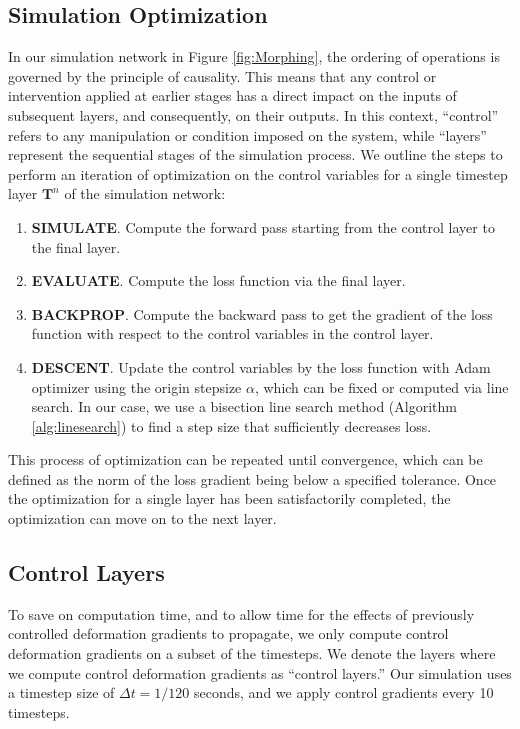 \subsection{Simulation Optimization}
    In our simulation network in Figure \ref{fig:Morphing}, the ordering of operations is governed by the principle of causality. This means that any control or intervention applied at earlier stages has a direct impact on the inputs of subsequent layers, and consequently, on their outputs. In this context, ``control'' refers to any manipulation or condition imposed on the system, while ``layers'' represent the sequential stages of the simulation process.
    We outline the steps to perform an iteration of optimization on the control variables for a single timestep layer $\textbf{T}^n$ of the simulation network:
\begin{enumerate}
    \item \textbf{SIMULATE}. Compute the forward pass starting from the control layer to the final layer.
    \item \textbf{EVALUATE}. Compute the loss function via the final layer.
    \item \textbf{BACKPROP}. Compute the backward pass to get the gradient of the loss function with respect to the control variables in the control layer.
    \item \textbf{DESCENT}. Update the control variables by the loss function with Adam optimizer using the origin stepsize $\alpha$, which can be fixed or computed via line search. In our case, we use a bisection line search method (Algorithm \ref{alg:linesearch}) to find a step size that sufficiently decreases loss.
\end{enumerate}
    This process of optimization can be repeated until convergence, which can be defined as the norm of the loss gradient being below a specified tolerance. 
    Once the optimization for a single layer has been satisfactorily completed, the optimization can move on to the next layer.

\subsection{Control Layers}
\label{sec:control-layers}
    To save on computation time, and to allow time for the effects of previously controlled deformation gradients to propagate, we only compute control deformation gradients on a subset of the timesteps. 
    We denote the layers where we compute control deformation gradients as ``control layers.'' 
    Our simulation uses a timestep size of $\Delta t = 1/120$ seconds, and we apply control gradients every 10 timesteps.

